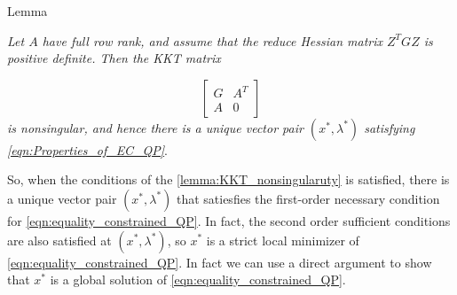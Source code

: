 \begin{mybox}{Lemma}
\begin{lemma}
\textit{Let $A$ have full row rank, and assume that the reduce Hessian matrix $Z^TGZ$ is positive definite. Then the KKT matrix}

\begin{equation}
	\begin{bmatrix}
  		G & A^T \\
    	A & 0
    \end{bmatrix}
\label{eqn:Properties_of_EC_QP_4}	
\end{equation}
\textit{is nonsingular, and hence there is a unique vector pair $(x^*, \lambda^*)$ satisfying \ref{eqn:Properties_of_EC_QP}}.	
\label{lemma:KKT_nonsingularuty}
\end{lemma}
\end{mybox}

So, when the conditions of the \ref{lemma:KKT_nonsingularuty} is satisfied, there is a unique vector pair $(x^*, \lambda^*)$ that satiesfies the first-order necessary condition for \ref{eqn:equality_constrained_QP}. In fact, the second order sufficient conditions are also satisfied at $(x^*, \lambda^*)$, so $x^*$ is a strict local minimizer of \ref{eqn:equality_constrained_QP}. In fact we can use a direct argument to show that $x^*$ is a global solution of \ref{eqn:equality_constrained_QP}.


